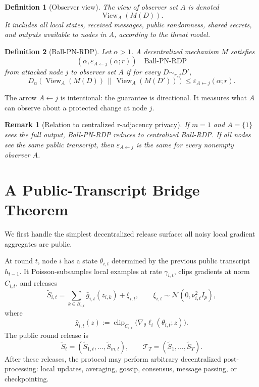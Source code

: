 \documentclass[conference,compsoc]{IEEEtran}
\newtheorem{definition}{Definition}
\newtheorem{remark}{Remark}
\DeclareMathOperator{\clip}{clip}
\newcommand{\N}{\mathcal{N}}
\newcommand{\cT}{\mathcal{T}}
\newcommand{\eps}{\varepsilon}
\begin{document}
\begin{definition}[Observer view]
The view of observer set $A$ is denoted
\[
\operatorname{View}_A(M(D)).
\]
It includes all local states, received messages, public randomness, shared secrets, and outputs available to nodes in $A$, according to the threat model.
\end{definition}

\begin{definition}[Ball-PN-RDP]
Let $\alpha>1$. A decentralized mechanism $M$ satisfies
\[
(\alpha,\eps_{A\leftarrow j}(\alpha;r))\quad\text{Ball-PN-RDP}
\]
from attacked node $j$ to observer set $A$ if for every $D\sim_{r,j}D'$,
\[
D_\alpha\!\left(
\operatorname{View}_A(M(D))
\,\middle\|\,
\operatorname{View}_A(M(D'))
\right)
\le
\eps_{A\leftarrow j}(\alpha;r).
\]
\end{definition}

The arrow $A\leftarrow j$ is intentional: the guarantee is directional. It measures what $A$ can observe about a protected change at node $j$.

\begin{remark}[Relation to centralized r-adjacency privacy]
If $m=1$ and $A=\{1\}$ sees the full output, Ball-PN-RDP reduces to centralized Ball-RDP. If all nodes see the same public transcript, then $\eps_{A\leftarrow j}$ is the same for every nonempty observer $A$.
\end{remark}

\section{A Public-Transcript Bridge Theorem}
\label{sec:public-bridge}

We first handle the simplest decentralized release surface: all noisy local gradient aggregates are public.

At round $t$, node $i$ has a state $\theta_{i,t}$ determined by the previous public transcript $h_{t-1}$. It Poisson-subsamples local examples at rate $\gamma_{i,t}$, clips gradients at norm $C_{i,t}$, and releases
\[
\widetilde S_{i,t}
=
\sum_{k\in B_{i,t}}\bar g_{i,t}(z_{i,k})+\xi_{i,t},
\qquad
\xi_{i,t}\sim\N(0,\nu_{i,t}^2I_p),
\]
where
\[
\bar g_{i,t}(z):=\clip_{C_{i,t}}\bigl(\nabla_\theta\ell_i(\theta_{i,t};z)\bigr).
\]
The public round release is
\[
\widetilde S_t=(\widetilde S_{1,t},\ldots,\widetilde S_{m,t}),
\qquad
\cT_T=(\widetilde S_1,\ldots,\widetilde S_T).
\]
After these releases, the protocol may perform arbitrary decentralized post-processing: local updates, averaging, gossip, consensus, message passing, or checkpointing.
\end{document}
